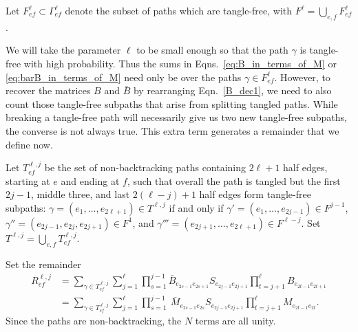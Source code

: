 \begin{definition}
Let $F_{ef}^\ell \subset \Gamma^\ell_{ef}$ 
denote the subset of paths
which are tangle-free,
with $F^\ell = \bigcup_{e,f} F^\ell_{ef}$. 
\end{definition}

We will take the parameter $\ell$ to be small enough so that
the path $\gamma$ is tangle-free with high probability.
Thus the sums in Eqns.~\eqref{eq:B_in_terms_of_M}
or \eqref{eq:barB_in_terms_of_M}
need only be over the paths 
$\gamma \in F_{ef}^\ell$.
However,
to recover the matrices $B$ and $\bar{B}$ by rearranging 
Eqn.~\eqref{B_dec1},
we need to also count those tangle-free 
subpaths that arise from splitting tangled paths.
While breaking a tangle-free path will necessarily
give us two new tangle-free subpaths, the converse is not always true. 
This extra term generates a remainder that we define now.

\begin{definition}
\label{def:tangled_paths}
Let $T^{\ell,j}_{ef}$ 
be the set of non-backtracking paths containing $2\ell+1$ half edges,
starting at $e$ and ending at $f$,
such that overall the path is tangled
but the first $2j-1$, middle three, and last $2(\ell - j)+1$ 
half edges form tangle-free subpaths:
$\gamma = (e_1, \ldots, e_{2\ell + 1}) \in T^{\ell,j}$
if and only if
$\gamma' = (e_1, \ldots, e_{2j-1}) \in F^{j-1}$,
$\gamma'' = (e_{2j-1}, e_{2j}, e_{2j+1}) \in F^{1}$,
and $\gamma''' = (e_{2j+1}, \ldots, e_{2\ell + 1}) \in F^{\ell - j}$.
Set $T^{\ell,j} = \bigcup_{e,f} T^{\ell,j}_{ef}$.
\end{definition}
Set the remainder
\begin{align}
    \label{error_term}
    R^{\ell,j}_{ef} 
    &= 
    \sum_{\gamma\in T^{\ell,j}_{ef}} 
    \sum_{j=1}^{\ell}
    \prod_{s=1}^{j-1}
    \bar{B}_{e_{2s-1} e_{2s+1}}
    S_{e_{2j-1} e_{2j+1}}
    \prod_{t=j+1}^{\ell} B_{e_{2t-1} e_{2t+1}}
    \nonumber \\
    &=
    \sum_{\gamma\in T^{\ell,j}_{ef}} 
    \sum_{j=1}^{\ell} 
    \prod_{s=1}^{j-1}\
    \bar{M}_{e_{2s-1} e_{2s}}
    S_{e_{2j-1} e_{2j+1}}
    \prod_{t=j+1}^{\ell} 
    M_{e_{2t-1} e_{2t}}.
\end{align}
Since the paths are non-backtracking, 
the $N$ terms are all unity.

